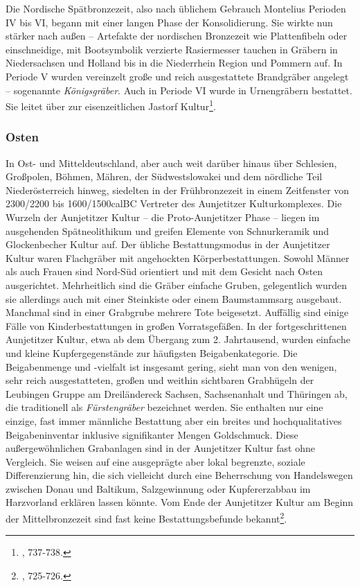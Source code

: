 \documentclass[openany,twoside,twocolumn]{book}
\let\rmarkdownfootnote\footnote%
\def\footnote{\protect\rmarkdownfootnote}
\begin{document}
Die Nordische Spätbronzezeit, also nach üblichem Gebrauch Montelius
Perioden IV bis VI, begann mit einer langen Phase der Konsolidierung.
Sie wirkte nun stärker nach außen -- Artefakte der nordischen Bronzezeit
wie Plattenfibeln oder einschneidige, mit Bootsymbolik verzierte
Rasiermesser tauchen in Gräbern in Niedersachsen und Holland bis in die
Niederrhein Region und Pommern auf. In Periode V wurden vereinzelt große
und reich ausgestattete Brandgräber angelegt -- sogenannte
\emph{Königsgräber}. Auch in Periode VI wurde in Urnengräbern bestattet.
Sie leitet über zur eisenzeitlichen Jastorf Kultur\footnote{\textcite{jockenhovel_germany_2013},
  737-738.}.

\hypertarget{osten}{%
\subsubsection{Osten}\label{osten}}

In Ost- und Mitteldeutschland, aber auch weit darüber hinaus über
Schlesien, Großpolen, Böhmen, Mähren, der Südwestslowakei und dem
nördliche Teil Niederösterreich hinweg, siedelten in der Frühbronzezeit
in einem Zeitfenster von 2300/2200 bis 1600/1500calBC Vertreter des
Aunjetitzer Kulturkomplexes. Die Wurzeln der Aunjetitzer Kultur -- die
Proto-Aunjetitzer Phase -- liegen im ausgehenden Spätneolithikum und
greifen Elemente von Schnurkeramik und Glockenbecher Kultur auf. Der
übliche Bestattungsmodus in der Aunjetitzer Kultur waren Flachgräber mit
angehockten Körperbestattungen. Sowohl Männer als auch Frauen sind
Nord-Süd orientiert und mit dem Gesicht nach Osten ausgerichtet.
Mehrheitlich sind die Gräber einfache Gruben, gelegentlich wurden sie
allerdings auch mit einer Steinkiste oder einem Baumstammsarg ausgebaut.
Manchmal sind in einer Grabgrube mehrere Tote beigesetzt. Auffällig sind
einige Fälle von Kinderbestattungen in großen Vorratsgefäßen. In der
fortgeschrittenen Aunjetitzer Kultur, etwa ab dem Übergang zum 2.
Jahrtausend, wurden einfache und kleine Kupfergegenstände zur häufigsten
Beigabenkategorie. Die Beigabenmenge und -vielfalt ist insgesamt gering,
sieht man von den wenigen, sehr reich ausgestatteten, großen und weithin
sichtbaren Grabhügeln der Leubingen Gruppe am Dreiländereck Sachsen,
Sachsenanhalt und Thüringen ab, die traditionell als
\emph{Fürstengräber} bezeichnet werden. Sie enthalten nur eine einzige,
fast immer männliche Bestattung aber ein breites und hochqualitatives
Beigabeninventar inklusive signifikanter Mengen Goldschmuck. Diese
außergewöhnlichen Grabanlagen sind in der Aunjetitzer Kultur fast ohne
Vergleich. Sie weisen auf eine ausgeprägte aber lokal begrenzte, soziale
Differenzierung hin, die sich vielleicht durch eine Beherrschung von
Handelswegen zwischen Donau und Baltikum, Salzgewinnung oder
Kupfererzabbau im Harzvorland erklären lassen könnte. Vom Ende der
Aunjetitzer Kultur am Beginn der Mittelbronzezeit sind fast keine
Bestattungsbefunde bekannt\footnote{\textcite{jockenhovel_germany_2013},
  725-726.}.
\end{document}
